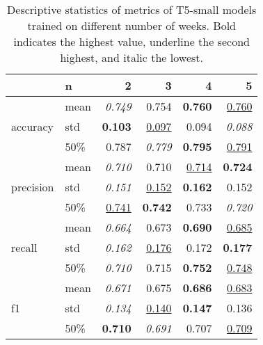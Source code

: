 \begin{table}
\caption{Descriptive statistics of metrics of T5-small models trained on different number of weeks. Bold indicates the highest value, underline the second highest, and italic the lowest.}
\label{tab:len_analysis}
\begin{tabular}{llrrrr}
\toprule
 & n & 2 & 3 & 4 & 5 \\
\midrule
\multirow[c]{3}{*}{accuracy} & mean & \textit{0.749} & 0.754 & \textbf{0.760} & \underline{0.760} \\
 & std & \textbf{0.103} & \underline{0.097} & 0.094 & \textit{0.088} \\
 & 50\% & 0.787 & \textit{0.779} & \textbf{0.795} & \underline{0.791} \\
\cline{1-6}
\multirow[c]{3}{*}{precision} & mean & \textit{0.710} & 0.710 & \underline{0.714} & \textbf{0.724} \\
 & std & \textit{0.151} & \underline{0.152} & \textbf{0.162} & 0.152 \\
 & 50\% & \underline{0.741} & \textbf{0.742} & 0.733 & \textit{0.720} \\
\cline{1-6}
\multirow[c]{3}{*}{recall} & mean & \textit{0.664} & 0.673 & \textbf{0.690} & \underline{0.685} \\
 & std & \textit{0.162} & \underline{0.176} & 0.172 & \textbf{0.177} \\
 & 50\% & \textit{0.710} & 0.715 & \textbf{0.752} & \underline{0.748} \\
\cline{1-6}
\multirow[c]{3}{*}{f1} & mean & \textit{0.671} & 0.675 & \textbf{0.686} & \underline{0.683} \\
 & std & \textit{0.134} & \underline{0.140} & \textbf{0.147} & 0.136 \\
 & 50\% & \textbf{0.710} & \textit{0.691} & 0.707 & \underline{0.709} \\
\cline{1-6}
\bottomrule
\end{tabular}
\end{table}
